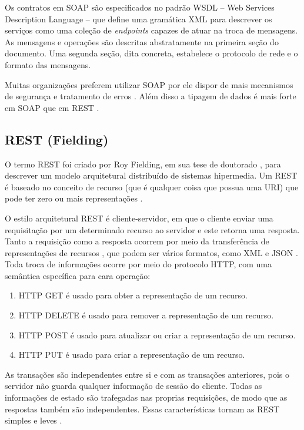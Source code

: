 Os contratos em SOAP são especificados no padrão WSDL -- Web Services
Description Language -- que define uma gramática XML para descrever os serviços
como uma coleção de \textit{endpoints} capazes de atuar na troca de mensagens.
As mensagens e operações são descritas abstratamente na primeira seção do
documento. Uma segunda seção, dita concreta, estabelece o protocolo de rede e o
formato das mensagens.

Muitas organizações preferem utilizar SOAP por ele dispor de mais mecanismos de
segurança e tratamento de erros \cite{serrano2014service}. Além disso a tipagem
de dados é mais forte em SOAP que em REST \cite{mumbaikar2013web}.


\subsection{REST (Fielding)}
\label{secaoREST}
\vspace{-6mm}

O termo REST foi criado por Roy Fielding, em sua tese de doutorado
\cite{fielding2000architectural}, para descrever um modelo arquitetural
distribuído de sistemas hipermedia. Um \ws{} REST é baseado no conceito de
recurso (que é qualquer coisa que possua uma URI) que pode ter zero ou mais
representações \cite{he2003service}.

O estilo arquitetural REST é cliente-servidor, em que o cliente enviar uma
requisitação por um determinado recurso ao servidor e este retorna uma resposta.
Tanto a requisição como a resposta ocorrem por meio da transferência de
representações de recursos \cite{mumbaikar2013web}, que podem ser vários
formatos, como XML e JSON \cite{serrano2014service}. Toda troca de informações
ocorre por meio do protocolo HTTP, com uma semântica específica para cara
operação:

\begin{enumerate}
\item HTTP GET é usado para obter a representação de um recurso.
\item HTTP DELETE é usado para remover a representação de um recurso.
\item HTTP POST é usado para atualizar ou criar a representação de um recurso.
\item HTTP PUT é usado para criar a representação de um recurso.
\end{enumerate}

As transações são independentes entre si e com as transações anteriores, pois o
servidor não guarda qualquer informação de sessão do cliente. Todas as
informações de estado são trafegadas nas proprias requisições, de modo que as
respostas também são independentes. Essas características tornam as \ws{} REST
simples e leves \cite{mumbaikar2013web}.

